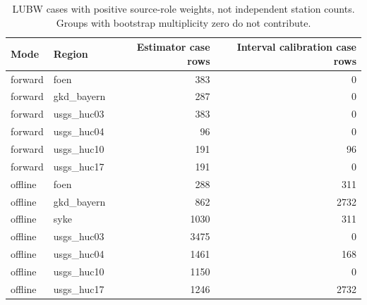 \begin{table}[p]\centering\small
\caption{LUBW cases with positive source-role weights, not independent station counts. Groups with bootstrap multiplicity zero do not contribute.}\label{tab:rights-roles}
\begin{tabular}{llrr}\toprule
Mode & Region & Estimator case rows & Interval calibration case rows\\\midrule
forward & foen & 383 & 0\\
forward & gkd\_bayern & 287 & 0\\
forward & usgs\_huc03 & 383 & 0\\
forward & usgs\_huc04 & 96 & 0\\
forward & usgs\_huc10 & 191 & 96\\
forward & usgs\_huc17 & 191 & 0\\
offline & foen & 288 & 311\\
offline & gkd\_bayern & 862 & 2732\\
offline & syke & 1030 & 311\\
offline & usgs\_huc03 & 3475 & 0\\
offline & usgs\_huc04 & 1461 & 168\\
offline & usgs\_huc10 & 1150 & 0\\
offline & usgs\_huc17 & 1246 & 2732\\
\bottomrule\end{tabular}
\end{table}
